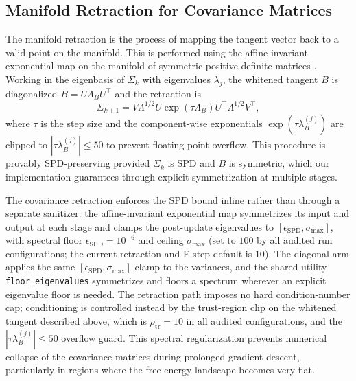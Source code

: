 \documentclass[twoside,11pt]{article}
\begin{document}
\subsection{Manifold Retraction for Covariance Matrices}\label{sec:retraction}
The manifold retraction is the process of mapping the tangent vector back to a valid point on the manifold. This is performed using the affine-invariant exponential map on the manifold of symmetric positive-definite matrices \citep{Pennec2006,Bhatia2007,Absil2008}. Working in the eigenbasis of $\Sigma_k$ with eigenvalues $\lambda_j$, the whitened tangent $B$ is diagonalized $B = U\Lambda_B U^\top$ and the retraction is
\begin{equation}
\Sigma_{k+1} = V \Lambda^{1/2} U \exp(\tau \Lambda_B) U^\top \Lambda^{1/2} V^\top,
\end{equation}
where $\tau$ is the step size and the component-wise exponentials $\exp(\tau \lambda_B^{(j)})$ are clipped to $|\tau \lambda_B^{(j)}| \le 50$ to prevent floating-point overflow. This procedure is provably SPD-preserving provided $\Sigma_k$ is SPD and $B$ is symmetric, which our implementation guarantees through explicit symmetrization at multiple stages.

The covariance retraction enforces the SPD bound inline rather than through a
separate sanitizer: the affine-invariant exponential map symmetrizes its input and
output at each stage and clamps the post-update eigenvalues to
$[\epsilon_{\mathrm{SPD}}, \sigma_{\max}]$, with spectral floor
$\epsilon_{\mathrm{SPD}} = 10^{-6}$ and ceiling $\sigma_{\max}$ (set to $100$ by all
audited run configurations; the current retraction and E-step default is $10$). The diagonal arm applies the same
$[\epsilon_{\mathrm{SPD}}, \sigma_{\max}]$ clamp to the variances, and the shared
utility \texttt{floor\_eigenvalues} symmetrizes and floors a spectrum wherever an
explicit eigenvalue floor is needed. The retraction path imposes no hard condition-number cap; conditioning is
controlled instead by the trust-region clip on the whitened tangent described above,
which is $\rho_{\mathrm{tr}}=10$ in all audited configurations, and the $|\tau\lambda_B^{(j)}| \le 50$ overflow guard. This spectral regularization
prevents numerical collapse of the covariance matrices during prolonged gradient
descent, particularly in regions where the free-energy landscape becomes very flat.
\end{document}
